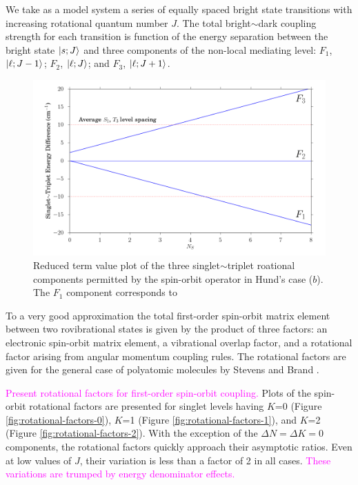 \documentclass[12pt]{mitthesis}
\newcommand{\POINT}[1]{\textcolor{magenta}{#1}}
\begin{document}
We take as a model system a series of equally spaced bright state
transitions with increasing rotational quantum number $J$.  The total
bright$\sim$dark coupling strength for each transition is function of
the energy separation between the bright state $\mathinner{|{s;J}\rangle}$ and three
components of the non-local mediating level: $F_1$, $\mathinner{|{\ell;J-1}\rangle}$;
$F_2$, $\mathinner{|{\ell;J}\rangle}$; and $F_3$, $\mathinner{|{\ell;J+1}\rangle}$.

\begin{figure}
  \caption{ Reduced term value plot of the three singlet$\sim$triplet
    roational components permitted by the spin-orbit operator in
    Hund's case ($b$).  The $F_1$ component corresponds to  }
  \label{fig:components}
  \centering
  \includegraphics[width=6in]{f-components.png}
\end{figure}

To a very good approximation the total first-order spin-orbit matrix
element between two rovibrational states is given by the product of
three factors: an electronic spin-orbit matrix element, a vibrational
overlap factor, and a rotational factor arising from angular momentum
coupling rules.  The rotational factors are given for the general case
of polyatomic molecules by Stevens and Brand \cite{stevens73}.  

\POINT{Present rotational factors for first-order spin-orbit
  coupling.}  Plots of the spin-orbit rotational factors are presented
for singlet levels having $K$=0 (Figure
\ref{fig:rotational-factors-0}), $K$=1 (Figure
\ref{fig:rotational-factors-1}), and $K$=2 (Figure
\ref{fig:rotational-factors-2}).  With the exception of the $\Delta N
= \Delta K = 0$ components, the rotational factors quickly approach
their asymptotic ratios.  Even at low values of $J$, their variation
is less than a factor of 2 in all cases.  \POINT{These variations are
  trumped by energy denominator effects.}
\end{document}
